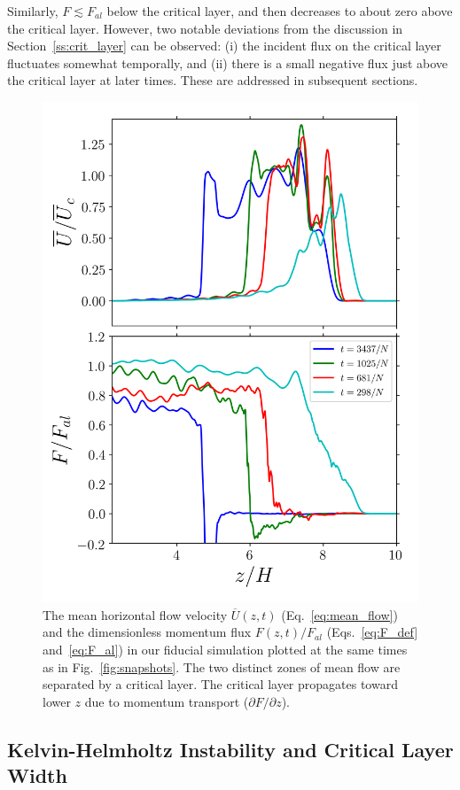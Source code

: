 \documentclass[
        fleqn,
        usenatbib,
    ]{mnras}
\newcommand*{\pdil}[2]{\partial#1/\partial#2}
\begin{document}
Similarly, $F \lesssim F_{al}$ below the critical layer, and then decreases to
about zero above the critical layer. However, two notable deviations from the
discussion in Section~\ref{ss:crit_layer} can be observed: (i) the incident flux
on the critical layer fluctuates somewhat temporally, and (ii) there is a small
negative flux just above the critical layer at later times. These are addressed
in subsequent sections.
\begin{figure}
    \centering
    \includegraphics[width=0.9\columnwidth]{plots/nl_fluxes.png}
    \caption{The mean horizontal flow velocity $\overline{U}(z, t)$
    (Eq.~\eqref{eq:mean_flow}) and the dimensionless momentum flux $F(z, t) /
    F_{al}$ (Eqs.~\eqref{eq:F_def} and~\eqref{eq:F_al}) in our fiducial
    simulation plotted at the same times as in Fig.~\ref{fig:snapshots}. The two
    distinct zones of mean flow are separated by a critical layer. The critical
    layer propagates toward lower $z$ due to momentum transport
    ($\pdil{F}{z}$).}\label{fig:nl_fluxes}
\end{figure}

\subsection{Kelvin-Helmholtz Instability and Critical Layer Width}\label{ss:khi}
\end{document}
